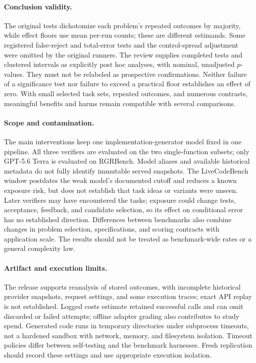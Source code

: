 \paragraph{Conclusion validity.} The original tests dichotomize each problem's repeated outcomes
by majority, while effect floors use mean per-run counts; these are different estimands. Some
registered false-reject and total-error tests and the control-spread adjustment were omitted by
the original runners. The review supplies completed tests and clustered intervals as explicitly
post hoc analyses, with nominal, unadjusted $p$-values. They must not be relabeled as prospective
confirmations. Neither failure of a significance test nor failure to exceed a practical floor
establishes an effect of zero. With small selected task sets, repeated outcomes, and numerous
contrasts, meaningful benefits and harms remain compatible with several comparisons.

\paragraph{Scope and contamination.} The main interventions keep one implementation-generator
model fixed in one pipeline. All three verifiers are evaluated on the two single-function
subsets; only GPT-5.6 Terra is evaluated on RGRBench. Model aliases and available historical
metadata do not fully identify immutable served snapshots. The LiveCodeBench window postdates
the weak model's documented cutoff and reduces a known exposure risk, but does not establish
that task ideas or variants were unseen. Later verifiers may have encountered the tasks;
exposure could change tests, acceptance, feedback, and candidate selection, so its effect on
conditional error has no established direction. Differences between benchmarks also combine
changes in problem selection, specifications, and scoring contracts with application scale.
The results should not be treated as benchmark-wide rates or a general complexity law.

\paragraph{Artifact and execution limits.} The release supports reanalysis of stored outcomes,
with incomplete historical provider snapshots, request settings, and some execution traces;
exact API replay is not established. Logged costs estimate retained successful calls and can
omit discarded or failed attempts; offline adapter grading also contributes to study spend.
Generated code runs in temporary directories under subprocess timeouts, not a hardened sandbox
with network, memory, and filesystem isolation. Timeout policies differ between self-testing
and the benchmark harnesses. Fresh replication should record these settings and use appropriate
execution isolation.

